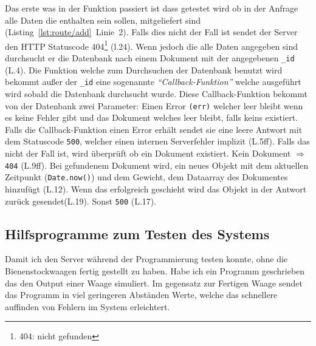 \documentclass[a4paper, ngerman, 11pt]{scrartcl}
\newcommand{\js}[1]{\texttt{#1}}
\begin{document}
Das erste was in der Funktion passiert ist dass getestet wird ob in der Anfrage alle Daten die enthalten sein sollen, mitgeliefert sind (Listing~\autoref{lst:route/add}~Linie~2).
Falls dies nicht der Fall ist sendet der Server den HTTP Statuscode 404\footnote{404: nicht gefunden} (l.24).
Wenn jedoch die alle Daten angegeben sind durchsucht er die Datenbank nach einem Dokument mit der angegebenen \js{_id} (L.4).
Die Funktion welche zum Durchsuchen der Datenbank benutzt wird bekommt außer der \js{_id} eine sogenannte \emph{\enquote{Callback-Funktion}} welche ausgeführt wird sobald die Datenbank durchsucht wurde.
Diese Callback-Funktion bekommt von der Datenbank zwei Parameter: Einen Error \js{(err)} welcher leer bleibt wenn es keine Fehler gibt und das Dokument welches leer bleibt, falls keins existiert. 
Falls die Callback-Funktion einen Error erhält sendet sie eine leere Antwort mit dem Statuscode \texttt{500}, welcher einen internen Serverfehler implizit (L.5ff). Falls das nicht der Fall ist, wird überprüft ob ein Dokument existiert. Kein Dokument $\Rightarrow$ \texttt{404} (L.9ff). Bei gefundenem Dokument wird, ein neues Objekt mit dem aktuellen Zeitpunkt (\js{Date.now()}) und dem Gewicht, dem Dataarray des Dokumentes hinzufügt (L.12). Wenn das erfolgreich geschieht wird das Objekt in der Antwort zurück gesendet(L.19). Sonst \texttt{500} (L.17).

\subsection[Tests]{Hilfsprogramme zum Testen des Systems} %

Damit ich den Server während der Programmierung testen konnte, ohne die Bienenstockwaagen fertig gestellt zu haben. Habe ich ein Programm geschrieben das den Output einer Waage simuliert. Im gegensatz zur Fertigen Waage sendet das Programm in viel geringeren Abständen Werte, welche das schnellere auffinden von Fehlern im System erleichtert.
\clearpage{}
\printbibheading{}
\printbibliography[type=book,heading=subbibliography,title={Buch Quellen}]
\printbibliography[type=misc,heading=subbibliography,title={Internet Quellen}]
\end{document}
